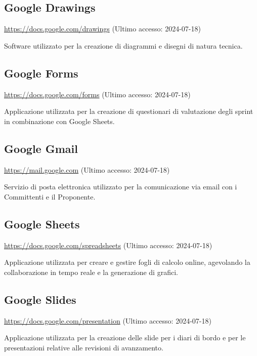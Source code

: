 \subsection{Google Drawings}
\par \href{https://docs.google.com/drawings}{https://docs.google.com/drawings} (Ultimo accesso: 2024-07-18)
\par Software utilizzato per la creazione di diagrammi e disegni di natura tecnica.

\subsection{Google Forms}
\par \href{https://docs.google.com/forms}{https://docs.google.com/forms} (Ultimo accesso: 2024-07-18)
\par Applicazione utilizzata per la creazione di questionari di valutazione degli sprint in combinazione con Google Sheets.

\subsection{Google Gmail}
\par \href{https://mail.google.com}{https://mail.google.com} (Ultimo accesso: 2024-07-18)
\par Servizio di posta elettronica utilizzato per la comunicazione via email con i Committenti e il Proponente.

\subsection{Google Sheets}
\par \href{https://docs.google.com/spreadsheets}{https://docs.google.com/spreadsheets} (Ultimo accesso: 2024-07-18)
\par Applicazione utilizzata per creare e gestire fogli di calcolo online, agevolando la collaborazione in tempo reale e la generazione di grafici.

\subsection{Google Slides}
\par \href{https://docs.google.com/presentation}{https://docs.google.com/presentation} (Ultimo accesso: 2024-07-18)
\par Applicazione utilizzata per la creazione delle slide per i diari di bordo e per le presentazioni relative alle revisioni di avanzamento.
    
